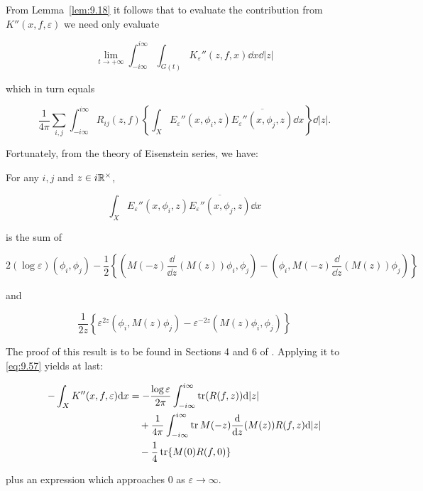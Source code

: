 From Lemma~\ref{lem:9.18} it follows that to evaluate the contribution from $K''(x, f, \varepsilon)$ we need only evaluate

\[
\lim_{t \to +\infty}\int_{-i\infty}^{i\infty}\int_{G(t)} K_\varepsilon''(z, f, x)\dd x\dd|z|
\]

which in turn equals

\begin{equation}\label{eq:9.57}
\frac{1}{4\pi}\sum_{i, j}\int_{-i\infty}^{i\infty} R_{ij}(z, f)\left\{\int_X E_\varepsilon''(x, \phi_i, z)\overline{E_\varepsilon''(x, \phi_j, z)}\dd x\right\}\dd|z|.\tag{9.57}
\end{equation}

Fortunately, from the theory of Eisenstein series, we have:

\begin{lemma}\label{lem:9.19}

For any $i, j$ and $z \in i\mathbb{R}^{\times}$,

\[
\int_X E_\varepsilon''(x, \phi_i, z)\overline{E_\varepsilon''(x, \phi_j, z)}\dd x
\]

is the sum of

\[
2(\log\varepsilon)(\phi_i, \phi_j) - \frac{1}{2}\left\{(M(-z)\frac{\dd}{\dd z}(M(z))\phi_i, \phi_j) - (\phi_i, M(-z)\frac{\dd}{\dd z}(M(z))\phi_j)\right\}
\]

and

\[
\frac{1}{2z}\left\{\varepsilon^{2z}(\phi_i, M(z)\phi_j) - \varepsilon^{-2z}(M(z)\phi_i, \phi_j)\right\}
\]

\end{lemma}

The proof of this result is to be found in Sections 4 and 6 of \cite{Langlands5}. Applying it to \eqref{eq:9.57} yields at last:

\begin{proposition}\label{prop:9.20}

\[
\begin{aligned}
-\int_X K''(x, f, \varepsilon)\mathrm{d} x &= -\frac{\log\varepsilon}{2\pi}\int_{-i\infty}^{i\infty}\operatorname{tr}(R(f, z))\mathrm{d}|z|\\
&\quad + \frac{1}{4\pi}\int_{-i\infty}^{i\infty}\operatorname{tr} M(-z)\frac{\mathrm{d}}{\mathrm{d} z}(M(z))R(f, z)\mathrm{d}|z|\\
&\quad - \frac{1}{4}\operatorname{tr}\{M(0)R(f, 0)\}
\end{aligned}
\]

plus an expression which approaches 0 as $\varepsilon \to \infty$.

\end{proposition}

